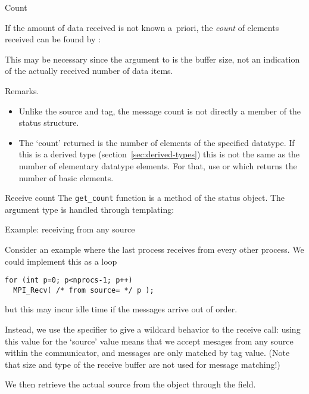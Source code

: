  {Count}
\label{sec:mpi-status-count}

If the amount of data received is not known a~priori, the
\emph{count} of elements received
can be found by 
:
%
%

This may be necessary since the  argument to  is 
the buffer size, not an indication of the actually received number of
data items.

Remarks.
\begin{itemize}
\item Unlike the source and tag, the message count is not directly a member of the status
  structure.
\item The `count' returned is the number of elements of the specified
  datatype. If this is a derived type
  (section~\ref{sec:derived-types}) this is not the same as the number
  of elementary datatype elements. For that, use
   or
  which returns the number of basic elements.
\end{itemize}

\begin{mplnote}{Receive count}
  The \lstinline+get_count+ function is a method of the status object.
  The argument type is handled through templating:
\end{mplnote}

 {Example: receiving from any source}

Consider an example where the last process receives from every other process.
We could implement this as a loop
\begin{lstlisting}
for (int p=0; p<nprocs-1; p++)
  MPI_Recv( /* from source= */ p );
\end{lstlisting}
but this may incur idle time if the messages arrive out of order.

Instead, we use the   specifier to give a wildcard
behavior to the receive call: using this value for the `source' value
means that we accept mesages from any source within the communicator,
and messages are only matched by tag value.
(Note that size and type of the receive buffer are not used for message matching!)

We then retrieve the
actual source from the  object through the
 field.
%
%

